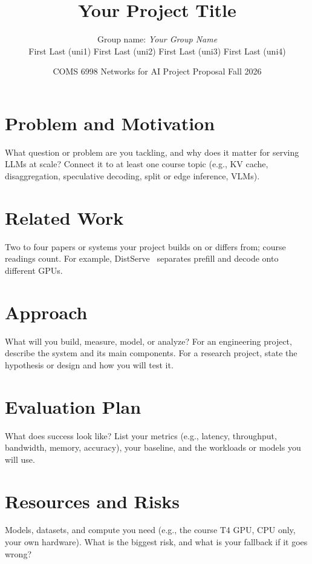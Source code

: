 \documentclass[11pt]{article}
\title{\vspace{-2em}Your Project Title}
\author{%
  Group name: \textit{Your Group Name}\\[0.4em]
  First Last (uni1) \quad First Last (uni2) \quad First Last (uni3) \quad First Last (uni4)}
\date{COMS 6998 Networks for AI \quad Project Proposal \quad Fall 2026}
\begin{document}
\maketitle

\section{Problem and Motivation}
What question or problem are you tackling, and why does it matter for serving
LLMs at scale? Connect it to at least one course topic (e.g., KV cache,
disaggregation, speculative decoding, split or edge inference, VLMs).

\section{Related Work}
Two to four papers or systems your project builds on or differs from; course
readings count. For example, DistServe~\cite{distserve} separates prefill and
decode onto different GPUs.

\section{Approach}
What will you build, measure, model, or analyze? For an engineering project,
describe the system and its main components. For a research project, state
the hypothesis or design and how you will test it.

\section{Evaluation Plan}
What does success look like? List your metrics (e.g., latency, throughput,
bandwidth, memory, accuracy), your baseline, and the workloads or models you
will use.


\section{Resources and Risks}
Models, datasets, and compute you need (e.g., the course T4 GPU, CPU only,
your own hardware). What is the biggest risk, and what is your fallback if it
goes wrong?
\end{document}
